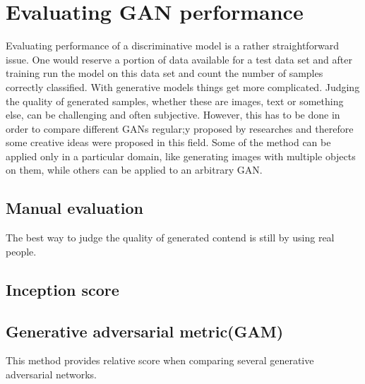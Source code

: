 \section{Evaluating GAN performance}
Evaluating performance of a discriminative model is a rather straightforward issue. One would reserve a portion of data available for a test data set and after training run the model on this data set and count the number of samples correctly classified. With generative models things get more complicated. Judging the quality of generated samples, whether these are images, text or something else, can be challenging and often subjective. However, this has to be done in order to compare different GANs regular;y proposed by researches and therefore some creative ideas were proposed in this field. Some of the method can be applied only in a particular domain, like generating images with multiple objects on them, while others can be applied to an arbitrary GAN. 
\subsection{Manual evaluation}
The best way to judge the quality of generated contend is still by using real people. 
\subsection{Inception score}

\subsection{Generative adversarial metric(GAM)}
This method provides relative score when comparing several generative adversarial networks.
